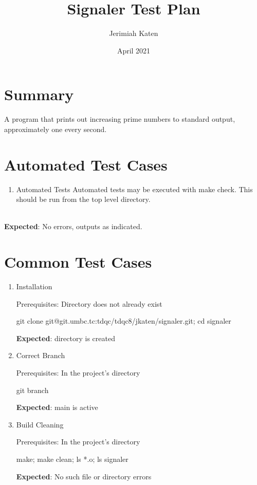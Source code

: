 \documentclass{article}
\title{Signaler Test Plan}
\author{Jerimiah Katen}
\date{April 2021}
\begin{document}
\maketitle

\section{Summary}

A program that prints out increasing prime numbers to standard output, approximately one every second.

\section{Automated Test Cases}
\begin{enumerate}
    \item Automated Tests
    Automated tests may be executed with {\footnotesize make check}. This should be run from the top level directory.
\end{enumerate}

\\[.5cm]
\textbf{Expected}: No errors, outputs as indicated.

\section{Common Test Cases}


\begin{enumerate}
    \item Installation
    
    Prerequisites: Directory does not already exist

    {\footnotesize git clone git@git.umbc.tc:tdqc/tdqc8/jkaten/signaler.git; cd signaler}
    
    \textbf{Expected}: directory is created

    \item Correct Branch
    
    Prerequisites: In the project's directory
    
    {\footnotesize git branch}
    
    \textbf{Expected}: {\footnotesize main} is active
    
    \item Build Cleaning
    
    Prerequisites: In the project's directory
    
    {\footnotesize make; make clean; ls *.o; ls signaler}
    
    \textbf{Expected}: No such file or directory errors
    
    
\end{enumerate}
\end{document}
